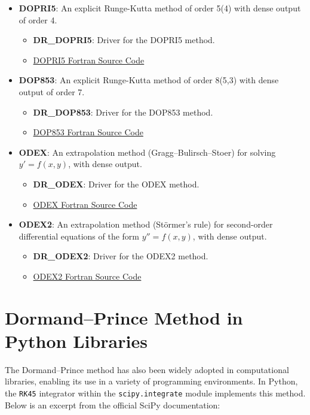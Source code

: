 \begin{itemize}
    \item \textbf{DOPRI5}: An explicit Runge-Kutta method of order 5(4) with dense output of order 4. 
    \begin{itemize}
        \item \textbf{DR\_DOPRI5}: Driver for the DOPRI5 method.
        \item \href{http://www.unige.ch/~hairer/prog/nonstiff/dopri5.f}{DOPRI5 Fortran Source Code}
    \end{itemize}
    
    \item \textbf{DOP853}: An explicit Runge-Kutta method of order 8(5,3) with dense output of order 7.
    \begin{itemize}
        \item \textbf{DR\_DOP853}: Driver for the DOP853 method.
        \item \href{http://www.unige.ch/~hairer/prog/nonstiff/dop853.f}{DOP853 Fortran Source Code}
    \end{itemize}
    
    \item \textbf{ODEX}: An extrapolation method (Gragg–Bulirsch–Stoer) for solving \( y' = f(x, y) \), with dense output.
    \begin{itemize}
        \item \textbf{DR\_ODEX}: Driver for the ODEX method.
        \item \href{http://www.unige.ch/~hairer/prog/nonstiff/odex.f}{ODEX Fortran Source Code}
    \end{itemize}
    
    \item \textbf{ODEX2}: An extrapolation method (Störmer's rule) for second-order differential equations of the form \( y'' = f(x, y) \), with dense output.
    \begin{itemize}
        \item \textbf{DR\_ODEX2}: Driver for the ODEX2 method.
        \item \href{http://www.unige.ch/~hairer/prog/nonstiff/odex2.f}{ODEX2 Fortran Source Code}
    \end{itemize}
\end{itemize}
\section{Dormand–Prince Method in Python Libraries}
The Dormand–Prince method has also been widely adopted in computational libraries, enabling its use in a variety of programming environments. In Python, the \texttt{RK45} integrator within the \texttt{scipy.integrate} module implements this method. Below is an excerpt from the official SciPy documentation:


